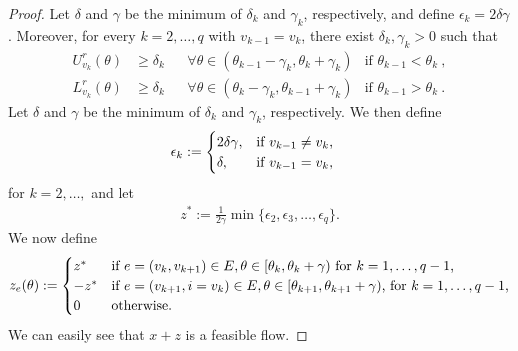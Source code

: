 \documentclass{svjour3}                     \smartqed
\begin{document}
\begin{proof}
Let
 $\delta$ and $\gamma$ be the minimum of $\delta_k$ and $\gamma_k$,
 respectively, and define $\epsilon_k=2\delta\gamma$.
 Moreover, for every
$k=2,\ldots,q$ with $v_{k-1}=v_k$, there exist $\delta_k,\gamma_k>0$
such that
\begin{align*}
U^r_{v_k}(\theta)&\geq \delta_k && \forall\theta\in (\theta_{k-1}-\gamma_k,\theta_{k}+\gamma_k) &\text{if } \theta_{k-1}<\theta_k~,\\
L^r_{v_k}(\theta)&\geq \delta_k&& \forall \theta\in (\theta_{k}-\gamma_k,\theta_{k-1}+\gamma_k) &\text{if } \theta_{k-1}>\theta_k~.
\end{align*}
Let
$\delta$ and $\gamma$ be the minimum of $\delta_k$ and $\gamma_k$,
respectively. We then define
\begin{align*}
\epsilon_k&:=\begin{cases}
                    2\delta\gamma, & \hbox{if $v_{k-1}\neq v_k$,}\\
                    \delta, & \hbox{if $v_{k-1}=v_k$,}
		\end{cases}
\end{align*}
for $k=2,\ldots,$ and let
\begin{align}
\label{eq:z*}
z^*:=\frac{1}{2\gamma}\min\{\epsilon_2,\epsilon_3,\ldots,\epsilon_{q}\}.
\end{align}
We now define
\begin{align*}
z_{e}(\theta):=\begin{cases}
                   z^* & \hbox{if $e=(v_{k},v_{k+1})\in E, \theta\in  [\theta_{k},\theta_{k}+\gamma)$ for $k=1,\ldots,q-1$,}\\
                    -z^* & \hbox{if $e=(v_{k+1},i=v_{k})\in E,\theta\in [\theta_{k+1},\theta_{k+1}+\gamma)$, for $k=1,\ldots,q-1$,}\\
                    0 & \hbox{otherwise.}
                \end{cases}
\end{align*}
We can easily see that $x+z$ is a feasible flow.



\end{proof}
\end{document}
